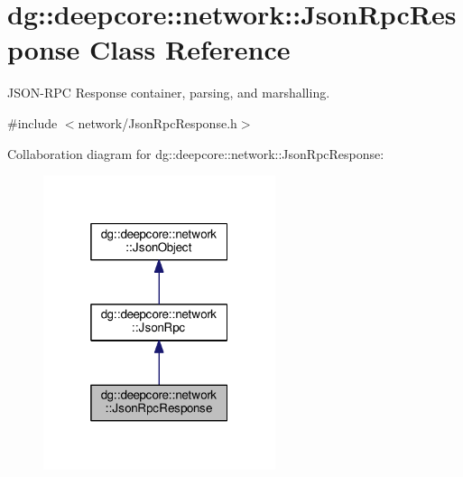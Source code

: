 \hypertarget{classdg_1_1deepcore_1_1network_1_1_json_rpc_response}{}\section{dg\+:\+:deepcore\+:\+:network\+:\+:Json\+Rpc\+Response Class Reference}
\label{classdg_1_1deepcore_1_1network_1_1_json_rpc_response}


J\+S\+O\+N-\/\+R\+PC Response container, parsing, and marshalling.  




{\ttfamily \#include $<$network/\+Json\+Rpc\+Response.\+h$>$}



Collaboration diagram for dg\+:\+:deepcore\+:\+:network\+:\+:Json\+Rpc\+Response\+:
\nopagebreak
\begin{figure}[H]
\begin{center}
\leavevmode
\includegraphics[width=193pt]{classdg_1_1deepcore_1_1network_1_1_json_rpc_response__coll__graph}
\end{center}
\end{figure}
